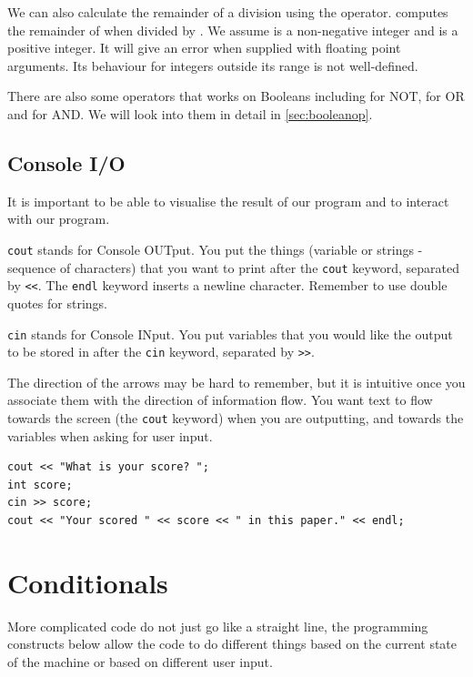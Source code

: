 We can also calculate the remainder of a division using the \code{\%} operator.  computes the remainder of  when divided by . We assume  is a non-negative integer and  is a positive integer. It will give an error when supplied with floating point arguments. Its behaviour for integers outside its range is not well-defined.

There are also some operators that works on Booleans including \code{!} for NOT, \code{\textbar\textbar} for OR and \code{\&\&} for AND. We will look into them in detail in \cref{sec:booleanop}.

\subsection*{Console I/O}

It is important to be able to visualise the result of our program and to interact with our program.

\texttt{cout} stands for Console OUTput. You put the things (variable or strings - sequence of characters) that you want to print after the \texttt{cout} keyword, separated by \texttt{<<}. The \texttt{endl} keyword inserts a newline character. Remember to use double quotes for strings.

\texttt{cin} stands for Console INput. You put variables that you would like the output to be stored in after the \texttt{cin} keyword, separated by \texttt{>>}. 

The direction of the arrows may be hard to remember, but it is intuitive once you associate them with the direction of information flow. You want text to flow towards the screen (the \texttt{cout} keyword) when you are outputting, and towards the variables when asking for user input.

\begin{lstlisting}
cout << "What is your score? ";
int score;
cin >> score;
cout << "Your scored " << score << " in this paper." << endl;
\end{lstlisting}

\section{Conditionals}

More complicated code do not just go like a straight line, the programming constructs below allow the code to do different things based on the current state of the machine or based on different user input.

